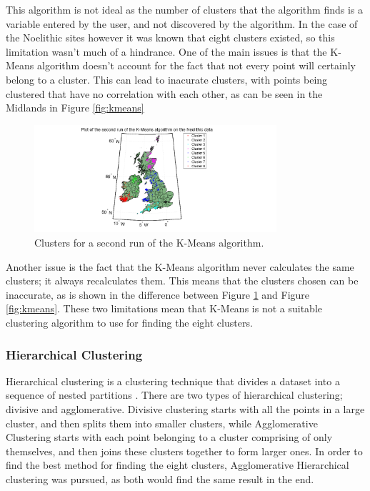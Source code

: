 \documentclass[a4paper]{article}
\begin{document}
This algorithm is not ideal as the number of clusters that the algorithm finds is a variable entered by the user, and not discovered by the algorithm. In the case of the Noelithic sites however it was known that eight clusters existed, so this limitation wasn't much of a hindrance. One of the main issues is that the K-Means algorithm doesn't account for the fact that not every point will certainly belong to a cluster. This can lead to inacurate clusters, with points being clustered that have no correlation with each other, as can be seen in the Midlands in Figure \ref{fig:kmeans}

\begin{figure}[H]
\centering
\includegraphics[width=0.8\textwidth]{kmeans2.png}
\caption{\label{fig:kmeans2}Clusters for a second run of the K-Means algorithm.}
\end{figure}

Another issue is the fact that the K-Means algorithm never calculates the same clusters; it always recalculates them. This means that the clusters chosen can be inaccurate, as is shown in the difference between Figure \ref{fig:kmeans2} and Figure \ref{fig:kmeans}. These two limitations mean that K-Means is not a suitable clustering algorithm to use for finding the eight clusters. 

\subsubsection{Hierarchical Clustering}
Hierarchical clustering is a clustering technique that divides a dataset into a sequence of nested partitions \cite{Hierarchical Clustering}. There are two types of hierarchical clustering; divisive and agglomerative. 
\newline\newline
Divisive clustering starts with all the points in a large cluster, and then splits them into smaller clusters, while Agglomerative Clustering starts with each point belonging to a cluster comprising of only themselves, and then joins these clusters together to form larger ones. In order to find the best method for finding the eight clusters, Agglomerative Hierarchical clustering was pursued, as both would find the same result in the end. 
\newline\newline
\end{document}
